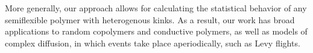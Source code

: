 \documentclass[%
 reprint,
superscriptaddress,
showpacs,preprintnumbers,
 amsmath,amssymb,
 aps,
 prl,
]{revtex4-1}
\begin{document}



More generally, our approach allows for calculating the statistical behavior of
any semiflexible polymer with heterogenous kinks. As a result, our work has broad
applications to random copolymers and conductive polymers, as well as models of complex
diffusion, in which events take place aperiodically, such as Levy flights.
\end{document}
